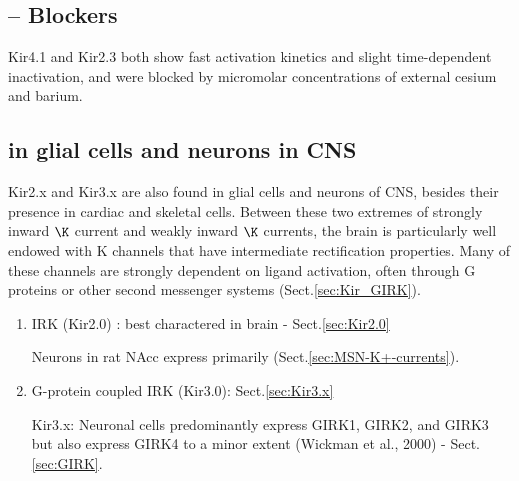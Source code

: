 \subsection{-- Blockers}

Kir4.1 and Kir2.3 both show fast activation kinetics and slight time-dependent
inactivation, and were blocked by micromolar concentrations of external cesium and
barium.



\subsection{in glial cells and neurons in CNS}


Kir2.x and Kir3.x are also found in glial cells and neurons of CNS, besides
their presence in cardiac and skeletal cells. Between these two extremes of
strongly inward $\K$ current and weakly inward $\K$ currents, the brain is
particularly well endowed with K channels that have intermediate rectification
properties. Many of these channels are strongly dependent on ligand activation,
often through G proteins or other second messenger systems
(Sect.\ref{sec:Kir_GIRK}).

\begin{enumerate}
  \item IRK (Kir2.0) : best charactered in brain - Sect.\ref{sec:Kir2.0}
  
Neurons in rat NAcc express primarily (Sect.\ref{sec:MSN-K+-currents}).
  
  \item G-protein coupled IRK (Kir3.0): Sect.\ref{sec:Kir3.x}

Kir3.x: Neuronal cells predominantly express GIRK1, GIRK2, and GIRK3 but also
express GIRK4 to a minor extent (Wickman et al., 2000) - Sect.\ref{sec:GIRK}.

\end{enumerate}


